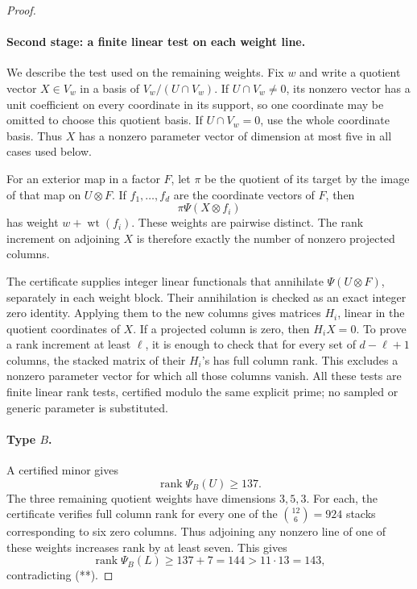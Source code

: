 \begin{proof}
\paragraph{Second stage: a finite linear test on each weight line.}
We describe the test used on the remaining weights.
Fix \(w\) and write a quotient vector \(X\in V_w\)
in a basis of \(V_w/(U\cap V_w)\).
If \(U\cap V_w\ne0\), its nonzero vector has a unit
coefficient on every coordinate in its support, so one
coordinate may be omitted to choose this quotient basis.
If \(U\cap V_w=0\), use the whole coordinate basis.
Thus \(X\) has a nonzero parameter vector of dimension
at most five in all cases used below.

For an exterior map in a factor \(F\), let
\(\pi\) be the quotient of its target by the image of
that map on \(U\otimes F\). If \(f_1,\ldots,f_d\) are
the coordinate vectors of \(F\), then
\[
 \pi\Psi(X\otimes f_i)
\]
has weight \(w+\operatorname{wt}(f_i)\).
These weights are pairwise distinct. The rank increment
on adjoining \(X\) is therefore exactly the number of
nonzero projected columns.

The certificate supplies integer linear functionals that
annihilate \(\Psi(U\otimes F)\), separately in each weight
block. Their annihilation is checked as an exact integer
zero identity. Applying them to the new columns gives
matrices \(H_i\), linear in the quotient coordinates of
\(X\). If a projected column is zero, then \(H_iX=0\).
To prove a rank increment at least \(\ell\), it is enough
to check that for every set of \(d-\ell+1\) columns,
the stacked matrix of their \(H_i\)'s has full column
rank. This excludes a nonzero parameter vector for which
all those columns vanish. All these tests are finite
linear rank tests, certified modulo the same explicit
prime; no sampled or generic parameter is substituted.

\paragraph{Type \(B\).}
A certified minor gives
\[
 \operatorname{rank}\Psi_B(U)\geq137.
\]
The three remaining quotient weights have dimensions
\(3,5,3\). For each, the certificate verifies full column
rank for every one of the
\(\binom{12}{6}=924\) stacks corresponding to six zero
columns. Thus adjoining any nonzero line of one of these
weights increases rank by at least seven. This gives
\[
 \operatorname{rank}\Psi_B(L)\geq137+7=144
   >11\cdot13=143,
\]
contradicting (**).


\end{proof}
